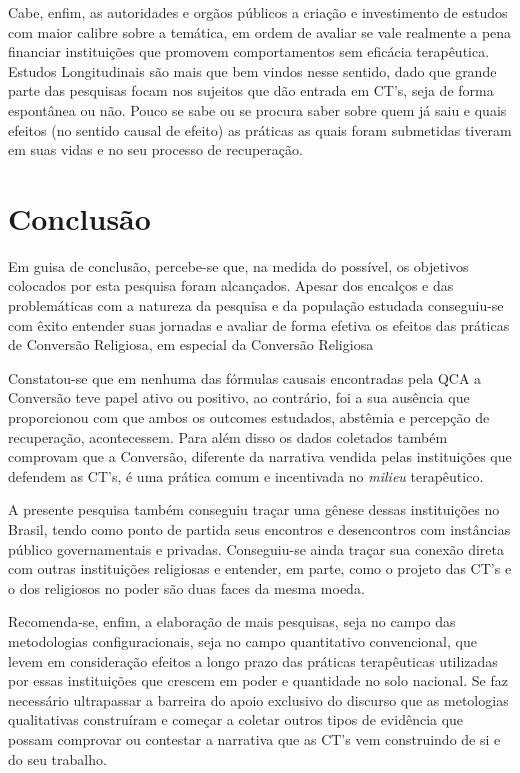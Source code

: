 \documentclass[
	12pt,				%
	oneside,			%
	a4paper,			%
	sumario=tradicional,
	english,			%
	brazil				%
	]{abntex2}
\begin{document}
Cabe, enfim, as autoridades e orgãos públicos a criação e investimento de estudos com maior calibre sobre a temática, em ordem de avaliar se vale realmente a pena financiar instituições que promovem comportamentos sem eficácia terapêutica. Estudos Longitudinais são mais que bem vindos nesse sentido, dado que grande parte das pesquisas focam nos sujeitos que dão entrada em CT's, seja de forma espontânea ou não. Pouco se sabe ou se procura saber sobre quem já saiu e quais efeitos (no sentido causal de efeito) as práticas as quais foram submetidas tiveram em suas vidas e no seu processo de recuperação.

\hypertarget{conclusuxe3o}{%
\chapter{Conclusão}\label{conclusuxe3o}}

Em guisa de conclusão, percebe-se que, na medida do possível, os objetivos colocados por esta pesquisa foram alcançados. Apesar dos encalços e das problemáticas com a natureza da pesquisa e da população estudada conseguiu-se com êxito entender suas jornadas e avaliar de forma efetiva os efeitos das práticas de Conversão Religiosa, em especial da Conversão Religiosa

Constatou-se que em nenhuma das fórmulas causais encontradas pela QCA a Conversão teve papel ativo ou positivo, ao contrário, foi a sua ausência que proporcionou com que ambos os outcomes estudados, abstêmia e percepção de recuperação, acontecessem. Para além disso os dados coletados também comprovam que a Conversão, diferente da narrativa vendida pelas instituições que defendem as CT's, é uma prática comum e incentivada no \emph{milieu} terapêutico.

A presente pesquisa também conseguiu traçar uma gênese dessas instituições no Brasil, tendo como ponto de partida seus encontros e desencontros com instâncias público governamentais e privadas. Conseguiu-se ainda traçar sua conexão direta com outras instituições religiosas e entender, em parte, como o projeto das CT's e o dos religiosos no poder são duas faces da mesma moeda.

Recomenda-se, enfim, a elaboração de mais pesquisas, seja no campo das metodologias configuracionais, seja no campo quantitativo convencional, que levem em consideração efeitos a longo prazo das práticas terapêuticas utilizadas por essas instituições que crescem em poder e quantidade no solo nacional. Se faz necessário ultrapassar a barreira do apoio exclusivo do discurso que as metologias qualitativas construíram e começar a coletar outros tipos de evidência que possam comprovar ou contestar a narrativa que as CT's vem construindo de si e do seu trabalho.
\end{document}
